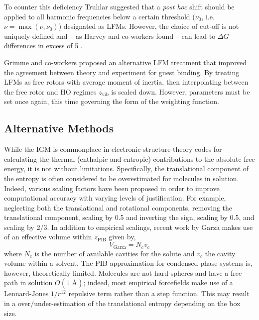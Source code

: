 \documentclass[../main.tex]{subfiles}
\begin{document}
To counter this deficiency Truhlar suggested that a \emph{post hoc} shift should be applied to all harmonic frequencies below a certain threshold ($\nu_0$, i.e. $\nu = \max(\nu, \nu_0)$) designated as LFMs.\cite{Ribeiro2011} However, the choice of cut-off is not uniquely defined and -- as Harvey and co-workers found -- can lead to $\Delta G$ differences in excess of 5 \kcal.\cite{Liu2017} 

Grimme and co-workers proposed an alternative LFM treatment that improved the agreement between theory and experiment for guest binding.\cite{Grimme2012} By treating LFMs as free rotors with average moment of inertia, then interpolating between the free rotor and HO regimes $z_\text{vib}$ is scaled down. However, parameters must be set once again, this time governing the form of the weighting function. 


\subsection{Alternative Methods}

While the IGM is commonplace in electronic structure theory codes for calculating the thermal (enthalpic and entropic) contributions to the absolute free energy, it is not without limitations. Specifically, the translational component of the entropy is often considered to be overestimated for molecules in solution.\cite{Gilson2010} Indeed, various scaling factors have been proposed in order to improve computational accuracy with varying levels of justification. For example, neglecting both the translational and rotational components,\cite{Sumimoto2004} removing the translational component,\cite{Tanaka2011} scaling by 0.5 and inverting the sign,\cite{Deubel2006} scaling by 0.5,\cite{Li2016} and scaling by 2/3.\cite{DiTommaso2010} In addition to empirical scalings, recent work by Garza\cite{Garza2019} makes use of an effective volume within $z_\text{PIB}$ given by,
\begin{equation}
V_\text{Garza} = N_c v_c
\end{equation}
where $N_c$ is the number of available cavities for the solute and $v_c$ the cavity volume within a solvent. The PIB approximation for condensed phase systems is, however, theoretically limited. Molecules are not hard spheres and have a free path in solution $O(1 \text{ \AA})$;\cite{Herman2016} indeed, most empirical forcefields make use of a Lennard-Jones $1/r^{12}$ repulsive term rather than a step function. This may result in a over/under-estimation of the translational entropy depending on the box size.
\end{document}
